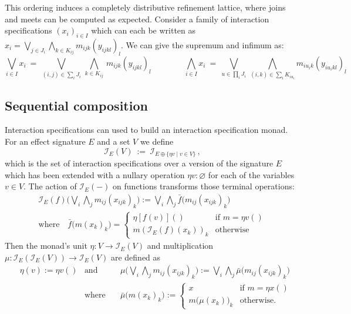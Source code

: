 \documentclass[11pt]{article}
\begin{document}
This ordering induces a completely distributive refinement lattice,
where joins and meets can be computed as expected.
Consider a family of interaction specifications $(x_i)_{i \in I}$
which can each be written as
$x_i = \bigvee_{j \in J_i} \bigwedge_{k \in K_{ij}} m_{ijk}(y_{ijkl})_l$.
We can give the supremum and infimum as:
\[
  \bigvee_{i \in I} x_i \:=\:
    \bigvee_{(i, j) \in \sum_i J_i} \,
    \bigwedge_{k \in K_{ij}} \,
    m_{ijk}(y_{ijkl})_l
  \qquad \qquad
  \bigwedge_{i \in I} x_i \:=\:
    \bigvee_{u \in \prod_i J_i} \,
    \bigwedge_{(i, k) \in \sum_i K_{i u_i}}
    m_{i u_i k}(y_{i u_i kl})_l
\]


\subsection{Sequential composition} %

Interaction specifications can used to build an interaction specification monad.
For an effect signature $E$ and a set $V$ we define
\[
  \mathcal{I}_E(V) \: := \: \mathcal{I}_{E \oplus \{\eta v \mid v \in V \}}
  \,,
\]
which is the set of interaction specifications
over a version of the signature $E$ which has been extended
with a nullary operation $\eta v : \varnothing$
for each of the variables $v \in V$.
The action of $\mathcal{I}_E(-)$ on functions
transforms those terminal operations:
\begin{gather*}
  \mathcal{I}_E(f)\Big( \bigvee_i \bigwedge_j m_{ij}(x_{ijk})_k \Big) :=
    \bigvee_i \bigwedge_j \bar{f}\big(m_{ij}(x_{ijk})_k \big)
  \\
  \text{where}
  \quad
  \bar{f}\big(m(x_k)_k\big) =
  \begin{cases}
    \eta[f(v)] () & \text{if } m = \eta v () \\ 
    m(\mathcal{I}_E(f)(x_k))_k & \text{otherwise}
  \end{cases}
\end{gather*}
Then the monad's unit
$\eta : V \rightarrow \mathcal{I}_E(V)$ and multiplication
$\mu : \mathcal{I}_E(\mathcal{I}_E(V)) \rightarrow \mathcal{I}_E(V)$
are defined as
\begin{align*}
  & \eta(v) := \eta v () & \text{and} \quad &
  \mu \Big( \bigvee_i \bigwedge_j m_{ij}(x_{ijk})_k \Big) :=
    \bigvee_i \bigwedge_j \bar{\mu} \big( m_{ij}(x_{ijk})_k \big) 
 \\
  && \text{where} \quad & \bar{\mu}\big(m(x_k)_k\big) :=
  \begin{cases}
    x & \text{if } m = \eta x () \\
    m\big(\mu(x_k)\big)_k & \text{otherwise.}
  \end{cases}
\end{align*}
\end{document}
